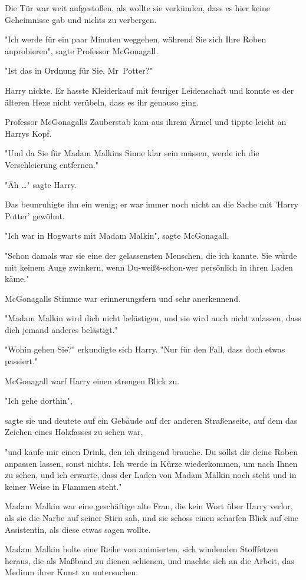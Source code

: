 {Die Tür war weit aufgestoßen, als wollte sie verkünden, dass es hier keine Geheimnisse gab und nichts zu verbergen.

"Ich werde für ein paar Minuten weggehen, während Sie sich Ihre Roben anprobieren", sagte Professor McGonagall.

"Ist das in Ordnung für Sie, Mr~Potter?"

Harry nickte. Er hasste Kleiderkauf mit feuriger Leidenschaft und konnte es der älteren Hexe nicht verübeln, dass es ihr genauso ging.

Professor McGonagalls Zauberstab kam aus ihrem Ärmel und tippte leicht an Harrys Kopf.

"Und da Sie für Madam Malkins Sinne klar sein müssen, werde ich die Verschleierung entfernen."

"Äh …" sagte Harry.

Das beunruhigte ihn ein wenig; er war immer noch nicht an die Sache mit 'Harry Potter' gewöhnt.

"Ich war in Hogwarts mit Madam Malkin", sagte McGonagall.

"Schon damals war sie eine der gelassensten Menschen, die ich kannte. Sie würde mit keinem Auge zwinkern, wenn Du-weißt-schon-wer persönlich in ihren Laden käme."

McGonagalls Stimme war erinnerungsfern und sehr anerkennend.

"Madam Malkin wird dich nicht belästigen, und sie wird auch nicht zulassen, dass dich jemand anderes belästigt."

"Wohin gehen Sie?" erkundigte sich Harry. "Nur für den Fall, dass doch etwas passiert."

McGonagall warf Harry einen strengen Blick zu.

"Ich gehe dorthin",

sagte sie und deutete auf ein Gebäude auf der anderen Straßenseite, auf dem das Zeichen eines Holzfasses zu sehen war,

"und kaufe mir einen Drink, den ich dringend brauche. Du sollst dir deine Roben anpassen lassen, sonst nichts. Ich werde in Kürze wiederkommen, um nach Ihnen zu sehen, und ich erwarte, dass der Laden von Madam Malkin noch steht und in keiner Weise in Flammen steht."

Madam Malkin war eine geschäftige alte Frau, die kein Wort über Harry verlor, als sie die Narbe auf seiner Stirn sah, und sie schoss einen scharfen Blick auf eine Assistentin, als diese etwas sagen wollte.

Madam Malkin holte eine Reihe von animierten, sich windenden Stofffetzen heraus, die als Maßband zu dienen schienen, und machte sich an die Arbeit, das Medium ihrer Kunst zu untersuchen.

}
